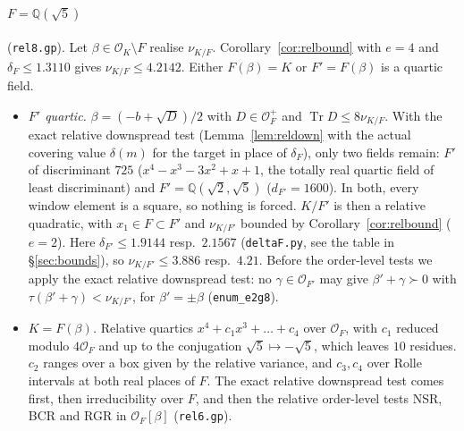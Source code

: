 \documentclass[11pt]{amsart}
\theoremstyle{definition}
\DeclareMathOperator{\Tr}{Tr}
\newcommand{\OK}{\mathcal{O}_K}
\newcommand{\OF}{\mathcal{O}_F}
\newcommand{\Q}{\mathbb{Q}}
\newcommand{\nurel}{\nu_{K/F}}
\newcommand{\file}[1]{\texttt{#1}}
\begin{document}
\paragraph{$F=\Q(\sqrt5)$} (\file{rel8.gp}).  Let $\beta\in\OK\setminus F$ realise
$\nurel$.  Corollary~\ref{cor:relbound} with $e=4$ and $\delta_F\le1.3110$ gives
$\nurel\le4.2142$.  Either $F(\beta)=K$ or $F'=F(\beta)$ is a quartic field.
\begin{itemize}[leftmargin=*]
\item \emph{$F'$ quartic.}  $\beta=(-b+\sqrt D)/2$ with $D\in\OF^+$ and $\Tr D\le8\nurel$.  With
  the exact relative downspread test (Lemma~\ref{lem:reldown} with the actual covering
  value $\delta(m)$ for the target in place of $\delta_F$), only two
  fields remain: $F'$ of discriminant $725$ ($x^4-x^3-3x^2+x+1$, the totally real quartic
  field of least discriminant) and $F'=\Q(\sqrt2,\sqrt5)$ ($d_{F'}=1600$).  In both, every window element is a square,
  so nothing is forced.  $K/F'$ is then a relative quadratic, with $x_1\in F\subset F'$ and
  $\nu_{K/F'}$ bounded by Corollary~\ref{cor:relbound} ($e=2$).  Here
  $\delta_{F'}\le1.9144$ resp.\ $2.1567$ (\file{deltaF.py}, see the table in \S\ref{sec:bounds}), so
  $\nu_{K/F'}\le3.886$ resp.\ $4.21$.  Before the order-level tests we apply the exact
  relative downspread test: no $\gamma\in\mathcal O_{F'}$ may give $\beta'+\gamma\succ0$ with
  $\tau(\beta'+\gamma)<\nu_{K/F'}$, for $\beta'=\pm\beta$ (\texttt{enum\_e2g8}).
\item \emph{$K=F(\beta)$.}  Relative quartics $x^4+c_1x^3+\dots+c_4$ over $\OF$, with
  $c_1$ reduced modulo $4\OF$ and up to the conjugation $\sqrt5\mapsto-\sqrt5$, which leaves
  $10$ residues.  $c_2$ ranges over a box given by the relative variance, and $c_3,c_4$ over
  Rolle intervals at both real places of $F$.  The exact relative downspread test comes
  first, then irreducibility over $F$, and then the relative order-level tests NSR, BCR and
  RGR in $\OF[\beta]$ (\file{rel6.gp}).
\end{itemize}
\end{document}
